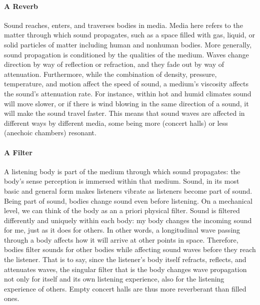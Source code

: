 \paragraph{A Reverb}
Sound reaches, enters, and traverses bodies in media. Media here refers to the matter through which sound propagates, such as a space filled with gas, liquid, or solid particles of matter including human and nonhuman bodies. More generally, sound propagation is conditioned by the qualities of the medium. Waves change direction by way of reflection or refraction, and they fade out by way of attenuation. Furthermore, while the combination of density, pressure, temperature, and motion affect the speed of sound, a medium's viscosity affects the sound's attenuation rate. For instance, within hot and humid climates sound will move slower, or if there is wind blowing in the same direction of a sound, it will make the sound travel faster. This means that sound waves are affected in different ways by different media, some being more (concert halls) or less (anechoic chambers) resonant.

\paragraph{A Filter}
A listening body is part of the medium through which sound propagates: the body's sense perception is immersed within that medium. Sound, in its most basic and general form makes listeners vibrate as listeners become part of sound. Being part of sound, bodies change sound even before listening. On a mechanical level, we can think of the body as an a priori physical filter. Sound is filtered differently and uniquely within each body: my body changes the incoming sound for me, just as it does for others. In other words, a longitudinal wave passing through a body affects how it will arrive at other points in space. Therefore, bodies filter sounds for other bodies while affecting sound waves before they reach the listener. That is to say, since the listener's body itself refracts, reflects, and attenuates waves, the singular filter that is the body changes wave propagation not only for itself and its own listening experience, also for the listening experience of others. Empty concert halls are thus more reverberant than filled ones. 

